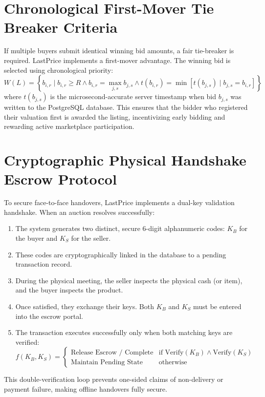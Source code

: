 \documentclass[12pt,a4paper,oneside]{report}
\begin{document}
\section{Chronological First-Mover Tie Breaker Criteria}
If multiple buyers submit identical winning bid amounts, a fair tie-breaker is required. LastPrice implements a first-mover advantage. The winning bid is selected using chronological priority:
\begin{equation}
W(L) = \left\{ b_{i,r} \mid b_{i,r} \ge R \land b_{i,r} = \max_{j, s} b_{j,s} \land t(b_{i,r}) = \min \left[ t(b_{j,s}) \mid b_{j,s} = b_{i,r} \right] \right\}
\end{equation}
where $t(b_{j,s})$ is the microsecond-accurate server timestamp when bid $b_{j,s}$ was written to the PostgreSQL database. This ensures that the bidder who registered their valuation first is awarded the listing, incentivizing early bidding and rewarding active marketplace participation.

\section{Cryptographic Physical Handshake Escrow Protocol}
To secure face-to-face handovers, LastPrice implements a dual-key validation handshake. When an auction resolves successfully:
\begin{enumerate}
    \item The system generates two distinct, secure 6-digit alphanumeric codes: $K_B$ for the buyer and $K_S$ for the seller.
    \item These codes are cryptographically linked in the database to a pending transaction record.
    \item During the physical meeting, the seller inspects the physical cash (or item), and the buyer inspects the product.
    \item Once satisfied, they exchange their keys. Both $K_B$ and $K_S$ must be entered into the escrow portal.
    \item The transaction executes successfully only when both matching keys are verified:
    \begin{equation}
    f(K_B, K_S) = \begin{cases} 
    \text{Release Escrow / Complete} & \text{if } \text{Verify}(K_B) \land \text{Verify}(K_S) \\
    \text{Maintain Pending State} & \text{otherwise}
    \end{cases}
    \end{equation}
\end{enumerate}
This double-verification loop prevents one-sided claims of non-delivery or payment failure, making offline handovers fully secure.
\end{document}
